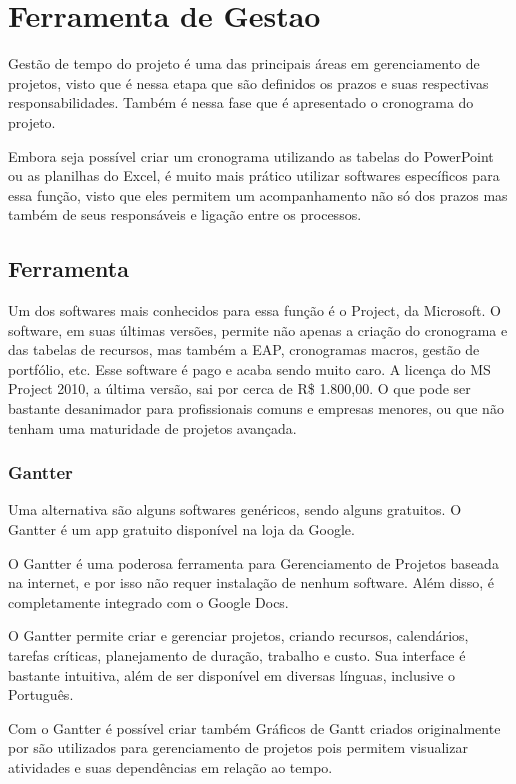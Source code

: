 \chapter[Ferramenta de Gestao]{Ferramenta de Gestao}

Gestão de tempo do projeto é uma das principais áreas em gerenciamento de projetos, visto que é nessa etapa que são definidos os prazos e suas respectivas responsabilidades. Também é nessa fase que é apresentado o cronograma do projeto.

Embora seja possível criar um cronograma utilizando as tabelas do PowerPoint ou as planilhas do Excel, é muito mais prático utilizar softwares específicos para essa função, visto que eles permitem um acompanhamento não só dos prazos mas também de seus responsáveis e ligação entre os processos.

\section{Ferramenta}

Um dos softwares mais conhecidos para essa função é o Project, da Microsoft. O software, em suas últimas versões, permite não apenas a criação do cronograma e das tabelas de recursos, mas também a EAP, cronogramas macros, gestão de portfólio, etc. Esse software é pago e acaba sendo muito caro. A licença do MS Project 2010, a última versão, sai por cerca de R\$ 1.800,00. O que pode ser bastante desanimador para profissionais comuns e empresas menores, ou que não tenham uma maturidade de projetos avançada.

\subsection{Gantter}

Uma alternativa são alguns softwares genéricos, sendo alguns gratuitos. O Gantter é um app gratuito disponível na loja da Google.

O Gantter é uma poderosa ferramenta para Gerenciamento de Projetos baseada na internet, e por isso não requer instalação de nenhum software. Além disso, é completamente integrado com o Google Docs.

O Gantter permite criar e gerenciar projetos, criando recursos, calendários, tarefas críticas, planejamento de duração, trabalho e custo. Sua interface é bastante intuitiva, além de ser disponível em diversas línguas, inclusive o Português.

Com o Gantter é possível criar também Gráficos de Gantt criados originalmente por \cite{HLGANTT} são utilizados para gerenciamento de projetos pois permitem visualizar atividades e suas dependências em relação ao tempo.


